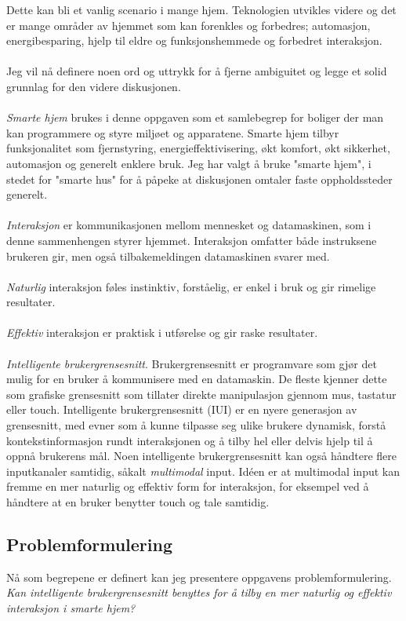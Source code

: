 Dette kan bli et vanlig scenario i mange hjem. Teknologien utvikles videre og det er mange områder av hjemmet som kan forenkles og forbedres; automasjon, energibesparing, hjelp til eldre og funksjonshemmede og forbedret interaksjon.\\\\
Jeg vil nå definere noen ord og uttrykk for å fjerne ambiguitet og legge et solid grunnlag for den videre diskusjonen.\\\\
\emph{Smarte hjem} brukes i denne oppgaven som et samlebegrep for boliger der man kan programmere og styre miljøet og apparatene. Smarte hjem tilbyr funksjonalitet som fjernstyring, energieffektivisering, økt komfort, økt sikkerhet, automasjon og generelt enklere bruk. Jeg har valgt å bruke "smarte hjem", i stedet for "smarte hus" for å påpeke at diskusjonen omtaler faste oppholdssteder generelt.\\\\
\emph{Interaksjon} er kommunikasjonen mellom mennesket og datamaskinen, som i denne sammenhengen styrer hjemmet. Interaksjon omfatter både instruksene brukeren gir, men også tilbakemeldingen datamaskinen svarer med.\\\\
\emph{Naturlig} interaksjon føles instinktiv, forståelig, er enkel i bruk og gir rimelige resultater.\\\\
\emph{Effektiv} interaksjon er praktisk i utførelse og gir raske resultater.\\\\
\emph{Intelligente brukergrensesnitt}. Brukergrensesnitt er programvare som gjør det mulig for en bruker å kommunisere med en datamaskin. De fleste kjenner dette som grafiske grensesnitt som tillater direkte manipulasjon gjennom mus, tastatur eller touch. Intelligente brukergrensesnitt (IUI) er en nyere generasjon av grensesnitt, med evner som å kunne tilpasse seg ulike brukere dynamisk, forstå kontekstinformasjon rundt interaksjonen og å tilby hel eller delvis hjelp til å oppnå brukerens mål. Noen intelligente brukergrensesnitt kan også håndtere flere inputkanaler samtidig, såkalt \emph{multimodal} input. Idéen er at multimodal input kan fremme en mer naturlig og effektiv form for interaksjon, for eksempel ved å håndtere at en bruker benytter touch og tale samtidig.

\subsection*{Problemformulering}
Nå som begrepene er definert kan jeg presentere oppgavens problemformulering.
\newline\newline
\emph{Kan intelligente brukergrensesnitt benyttes for å tilby en mer naturlig og effektiv interaksjon i smarte hjem?}

